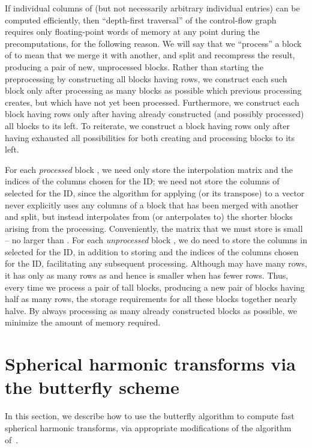 \documentclass[final,3p,times]{elsarticle}
\begin{document}
If individual columns of 
(but not necessarily arbitrary individual entries) can be computed efficiently,
then ``depth-first traversal'' of the control-flow graph
requires only  floating-point words of memory
at any point during the precomputations, for the following reason.
We will say that we ``process'' a block of  to mean that we merge it
with another, and split and recompress the result,
producing a pair of new, unprocessed blocks.
Rather than starting the preprocessing by constructing all blocks
having  rows, we construct each such block only after processing
as many blocks as possible which previous processing creates,
but which have not yet been processed.
Furthermore, we construct each block having  rows only after having already
constructed (and possibly processed) all blocks to its left.
To reiterate, we construct a block having  rows only after having exhausted
all possibilities for both creating and processing blocks to its left.

For each {\it processed} block , we need only store the interpolation matrix
 and the indices of the columns chosen for the ID;
we need not store the  columns of  selected for the ID,
since the algorithm for applying  (or its transpose) to a vector
never explicitly uses any columns of a block that has been merged
with another and split, but instead interpolates from (or anterpolates to)
the shorter blocks arising from the processing.
Conveniently, the matrix  that we must store is small
-- no larger than .
For each {\it unprocessed} block , we do need to store the  columns
in  selected for the ID, in addition to storing 
and the indices of the columns chosen for the ID,
facilitating any subsequent processing.
Although  may have many rows, it has only as many rows as 
and hence is smaller when  has fewer rows.
Thus, every time we process a pair of tall blocks, producing a new pair
of blocks having half as many rows,
the storage requirements for all these blocks together nearly halve.
By always processing as many already constructed blocks as possible,
we minimize the amount of memory required.



\section{Spherical harmonic transforms via the butterfly scheme}
\label{spharmonics}


In this section, we describe how to use the butterfly algorithm
to compute fast spherical harmonic transforms,
via appropriate modifications of the algorithm of~\cite{tygert_sph}.
\end{document}
